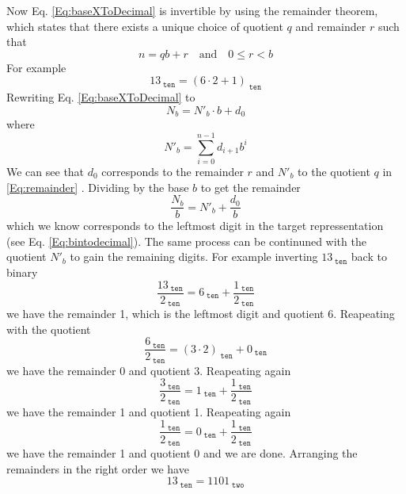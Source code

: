     Now Eq. \ref{Eq:baseXToDecimal} is invertible by using the remainder theorem, which states that there exists a unique choice of quotient $q$ and remainder $r$ such that 
    \begin{equation}\label{Eq:remainder}
        n = qb+r \quad \text{and} \quad 0 \leq r < b
    \end{equation}
    For example
    \begin{equation}
        13_{\;\texttt{ten}} = (6\cdot 2 + 1)_{\;\texttt{ten}}
    \end{equation}
    Rewriting Eq. \ref{Eq:baseXToDecimal} to
    \begin{equation}\label{Eq:baseXToDecimalRemainderForm}
        N_b = N'_b \cdot b+d_0
    \end{equation}
    where
    \begin{equation}
        N'_b = \sum_{i=0}^{n-1} d_{i+1} b^i
    \end{equation}
    We can see that $d_0$ corresponds to the remainder $r$ and $N'_b$ to the quotient $q$ in \ref{Eq:remainder} .
    Dividing by the base $b$ to get the remainder
    \begin{equation}
        \frac{N_b}{b} = N'_b +\frac{d_0}{b}
    \end{equation}
    which we know corresponds to the leftmost digit in the target repressentation (see Eq. \ref{Eq:bintodecimal}). The same process can be continuned with the quotient $N'_b$ to gain the remaining digits.
    For example inverting $13_{\;\texttt{ten}}$ back to binary
    \begin{equation}
        \frac{13_{\;\texttt{ten}}}{2_{\;\texttt{ten}}} = 6_{\;\texttt{ten}} + \frac{1_{\;\texttt{ten}} }{2_{\;\texttt{ten}} }
    \end{equation}
    we have the remainder 1, which is the leftmost digit and quotient 6. Reapeating with the quotient
    \begin{equation}
        \frac{6_{\;\texttt{ten}}}{2_{\;\texttt{ten}}} = (3\cdot 2)_{\;\texttt{ten}} + 0_{\;\texttt{ten}} 
    \end{equation}
    we have the remainder 0 and quotient 3. Reapeating again
    \begin{equation}
        \frac{3_{\;\texttt{ten}}}{2_{\;\texttt{ten}}} = 1_{\;\texttt{ten}} + \frac{1_{\;\texttt{ten}} }{2_{\;\texttt{ten}} }
    \end{equation}
    we have the remainder 1 and quotient 1. Reapeating again
    \begin{equation}
    \frac{1_{\;\texttt{ten}}}{2_{\;\texttt{ten}}} = 0_{\;\texttt{ten}} + \frac{1_{\;\texttt{ten}} }{2_{\;\texttt{ten}} }
    \end{equation}
    we have the remainder 1 and quotient 0 and we are done.
    Arranging the remainders in the right order we have
    \begin{equation}
    13_{\;\texttt{ten}} = 1101_{\;\texttt{two}} 
    \end{equation}
    
